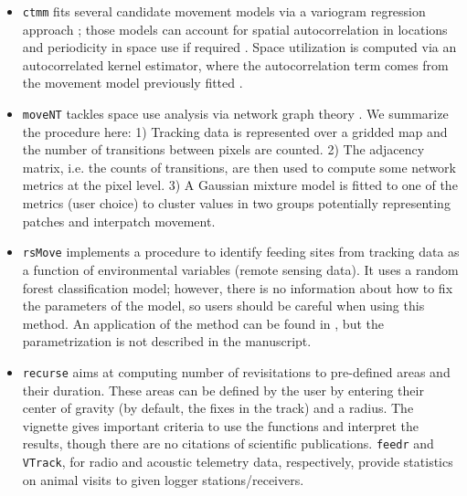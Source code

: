 \documentclass[a4paper,12pt]{article}
\newcommand{\Rpkg}[1]{\texttt{#1}}
\begin{document}
\begin{itemize}
        \item \Rpkg{ctmm} fits several candidate movement models via a variogram regression approach \citep{Fleming2014}; those models can account for spatial autocorrelation in locations and periodicity in space use if required \citep{Peron2016}. Space utilization is computed via an autocorrelated kernel estimator, where the autocorrelation term comes from the movement model previously fitted \citep{Fleming2015}. 
        \item \Rpkg{moveNT} tackles space use analysis via network graph theory \citep{Bastille2018}. We summarize the procedure here: 1) Tracking data is represented over a gridded map and the number of transitions between pixels are counted. 2) The adjacency matrix, i.e. the counts of transitions, are then used to compute some network metrics at the pixel level. 3) A Gaussian mixture model is fitted to one of the metrics (user choice) to cluster values in two groups potentially representing patches and interpatch movement.
        \item \Rpkg{rsMove} implements a procedure to identify feeding sites from tracking data as a function of environmental variables (remote sensing data). It uses a random forest classification model; however, there is no information about how to fix the parameters of the model, so users should be careful when using this method. An application of the method can be found in \cite{Remelgado2017}, but the parametrization is not described in the manuscript.
        \item \Rpkg{recurse} aims at computing number of revisitations to pre-defined areas and their duration. These areas can be defined by the user by entering their center of gravity (by default, the fixes in the track) and a radius. The vignette gives important criteria to use the functions and interpret the results, though there are no citations of scientific publications.
        \Rpkg{feedr} and \Rpkg{VTrack}, for radio and acoustic telemetry data, respectively, provide statistics on animal visits to given logger stations/receivers. 
\end{itemize}
\end{document}
